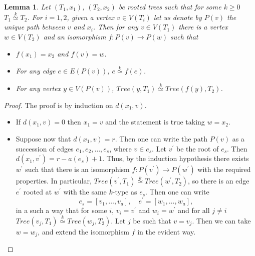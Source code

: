 \documentclass[11pt,notitlepage]{report}
\newtheorem{lemma}{Lemma}[chapter]
\theoremstyle{definition}
\newcommand{\morph}[1]{\stackrel{#1}{\simeq}}
\begin{document}
\begin{lemma}
	Let $(T_1,x_1)$, $(T_2,x_2)$ be rooted trees such that for some $k\geq 0$
	$T_1\morph{k} T_2$. For $i=1,2$, given a vertex $v\in V(T_i)$ let us denote by
	$P(v)$ the unique path between $v$ and $x_i$.
	Then for any $v\in V(T_1)$ there is a vertex $w\in V(T_2)$ and an isomorphism
	$f:P(v)\rightarrow P(w)$ such that
	\begin{itemize}
		\item[(1)]  $f(x_1)=x_2$ and $f(v)=w$.
		\item[(2)] For any edge $e\in E(P(v))$, $e\morph{k} f(e)$.
		\item[(3)] For any vertex $y\in V(P(v))$, $Tree(y,T_1)\morph{k} Tree(f(y),T_2)$.
	\end{itemize}
\end{lemma}
\begin{proof}
	The proof is by induction on $d(x_1, v)$.
	\begin{itemize}
		\item If $d(x_1,v)=0$ then $x_1=v$ and the statement is true taking $w=x_2$.
		\item Suppose now that $d(x_1,v)=r$. Then one can write the path $P(v)$ as a
		succession of edges $e_1,e_2,\dots, e_s$, where $v\in e_s$. Let $v^\prime$ be 
		the root of $e_s$. Then $d(x_1,v^\prime)=r-a(e_s)+1$. Thus, by the
		induction hypothesis there exists $w^\prime$ such that there is an isomorphism
		$f: P(v^\prime)\rightarrow P(w^\prime)$ with the required properties. 
		In particular, $Tree(v^\prime,T_1)\morph{k}Tree(w^\prime,T_2)$, so there is an
		edge $e^\prime$ rooted at $w^\prime$ with the same $k$-type as $e_s$. Then one can write
		\[e_s=[v_1,\dots,v_a], \quad  e^\prime=[w_1,\dots,w_a], \]
		in a such a way that for some $i$, $v_i=v^\prime$ and $w_i=w^\prime$ and for all $j\neq i$
		$Tree(v_j,T_1)\morph{k} Tree(w_j,T_2)$. Let $j$ be such that $v=v_j$. Then we can take
		$w=w_j$, and extend the isomorphism $f$ in the evident way. 
	\end{itemize}
\end{proof}
\end{document}
